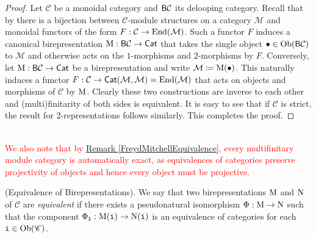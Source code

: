 \noindent\begin{proof} Let $\mathcal{C}$ be a monoidal category and $\textnormal{\textsf{B}}\mathcal{C}$ its delooping category. Recall that by \cite[Proposition 7.1.3]{EGNO16} there is a bijection between $\mathcal{C}$-module structures on a category $\mathcal{M}$ and monoidal functors of the form $F : \mathcal{C} \to \textnormal{End}(\mathcal{M})$. Such a functor $F$ induces a canonical birepresentation $\textnormal{M} : \textnormal{\textsf{B}}\mathcal{C} \to \textnormal{\textsf{Cat}}$ that takes the single object $\bullet \in \textnormal{Ob}(\textnormal{\textsf{B}}\mathcal{C})$ to $\mathcal{M}$ and otherwise acts on the $1$-morphisms and $2$-morphisms by $F$. Conversely, let $\textnormal{M} : \textnormal{\textsf{B}}\mathcal{C} \to \textnormal{\textsf{Cat}}$ be a birepresentation and write $\mathcal{M} \coloneqq \textnormal{M}(\bullet)$. This naturally induces a functor $F : \mathcal{C} \to \textnormal{\textsf{Cat}}(\mathcal{M}, \mathcal{M}) = \textnormal{End}(\mathcal{M})$ that acts on objects and morphisms of $\mathcal{C}$ by $\textnormal{M}$. Clearly these two constructions are inverse to each other and (multi)finitarity of both sides is equivalent. It is easy to see that if $\mathcal{C}$ is strict, the result for $2$-representations follows similarly. This completes the proof.
\end{proof}\\

\noindent \textcolor{red}{We also note that by \hyperref[FreydMitchellEquivalence]{Remark \ref*{FreydMitchellEquivalence}}, every multifinitary module category is automatically exact, as equivalences of categories preserve projectivity of objects and hence every object must be projective.}\\

\noindent\begin{definition}\textnormal{(Equivalence of Birepresentations).} We say that two birepresentations $\textnormal{M}$ and $\textnormal{N}$ of $\mathscr{C}$ are {\em equivalent} if there exists a pseudonatural isomorphism $\Phi : \textnormal{M} \to \textnormal{N}$ such that the component $\Phi_{\textnormal{\texttt{i}}} : \textnormal{M}(\textnormal{\texttt{i}}) \to \textnormal{N}(\textnormal{\texttt{i}})$ is an equivalence of categories for each $\textnormal{\texttt{i}} \in \textnormal{Ob}(\mathscr{C})$.\\
\end{definition}

